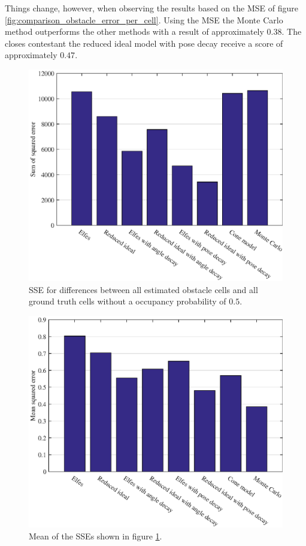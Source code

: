 Things change, however, when observing the results based on the MSE of figure \vref{fig:comparison_obstacle_error_per_cell}. 
Using the MSE the Monte Carlo method outperforms the other methods with a result of approximately \( 0.38\). The closes contestant the reduced ideal model with pose decay receive a score of approximately \(0.47\).

\begin{figure}[htbp]
	\centering
	\includegraphics[scale=1]{figures/static_mapping/static_mapping_sse}
	\caption{SSE for differences between all estimated obstacle cells and all ground truth cells without a occupancy probability of $0.5$.}
	\label{fig:comparison_obstacle_error}
\end{figure}

\begin{figure}[htbp]
	\centering
	\includegraphics[scale=1]{figures/static_mapping/static_mapping_mse}
	\caption{Mean of the SSEs shown in figure \ref{fig:comparison_obstacle_error}.}
	\label{fig:comparison_obstacle_error_per_cell}
\end{figure}

